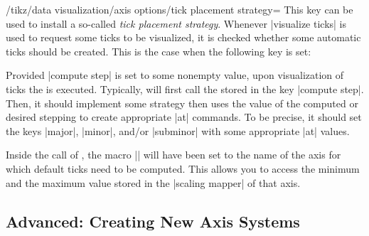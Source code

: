 \begin{key}{/tikz/data visualization/axis options/tick placement strategy=}
    This key can be used to install a so-called \emph{tick placement strategy}.
    Whenever |visualize ticks| is used to request some ticks to be visualized,
    it is checked whether some automatic ticks should be created. This is the
    case when the following key is set:

    Provided |compute step| is set to some nonempty value, upon visualization
    of ticks the  is executed. Typically,  will first
    call the  stored in the key |compute step|. Then, it should
    implement some strategy then uses the value of the computed or desired
    stepping to create appropriate |at| commands. To be precise, it should set
    the keys |major|, |minor|, and/or |subminor| with some appropriate |at|
    values.

    Inside the call of , the macro |\tikzdvaxis| will have been set
    to the name of the axis for which default ticks need to be computed. This
    allows you to access the minimum and the maximum value stored in the
    |scaling mapper| of that axis.
\begin{codeexample}[width=7cm,preamble={\usetikzlibrary{datavisualization}}]
\def\silly{
  \tikzdatavisualizationset{major={at={
        2,3,5,7,11,13}}}
}%
\end{codeexample}
\end{key}


\subsection{Advanced: Creating New Axis Systems}

